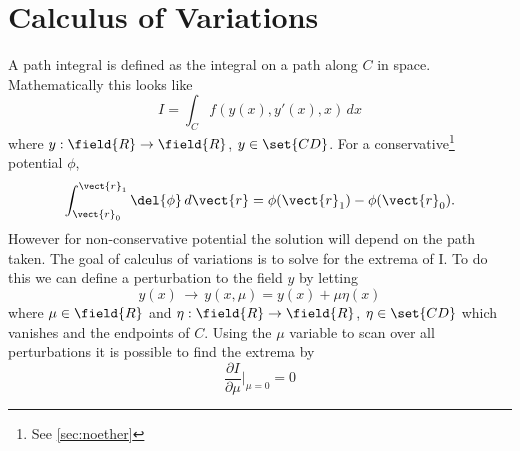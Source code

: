 \chapter{Calculus of Variations}
%

A path integral is defined as the integral on a path along $C$ in space.
Mathematically this looks like
\begin{equation}
	I = \int_C f(y(x), y'(x), x) \, dx 
\end{equation}
where $y:\field{R} \rightarrow \field{R}$, $y \in \set{CD} $.
For a conservative\footnote{See \vref{sec:noether}} potential $\phi$, 
\begin{equation}
	\int^{\vect{r}_1}_{\vect{r}_0} \del{\phi} \, d\vect{r} = \phi(\vect{r}_1) -\phi(\vect{r}_0) .
\end{equation}
However for non-conservative potential the solution will depend on the path taken.
The goal of calculus of variations is to solve for the extrema of I.
To do this we can define a perturbation to the field $y$ by letting 
\begin{equation}
	y(x) \, \rightarrow \, y(x,\mu) = y(x) + \mu \eta(x) 
\end{equation}
where $\mu \in \field{R}$ and $\eta:\field{R} \rightarrow \field{R}$, $\eta \in \set{CD}$ which vanishes and the endpoints of $C$.
Using the $\mu$ variable to scan over all perturbations it is possible to find the extrema by
\begin{equation}
	\frac{\partial{I}}{\partial{\mu}}\vert_{\mu = 0} = 0
\end{equation}


